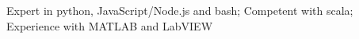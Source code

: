 \item Expert in python, JavaScript/Node.js and bash; Competent with scala; Experience with MATLAB and LabVIEW
